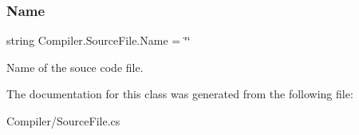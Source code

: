 \subsubsection{\texorpdfstring{Name}{Name}}
{\footnotesize\ttfamily string Compiler.\+Source\+File.\+Name = \char`\"{}\char`\"{}\hspace{0.3cm}{\ttfamily [get]}}

Name of the souce code file. 

The documentation for this class was generated from the following file\+:\begin{DoxyCompactItemize}
\item 
Compiler/Source\+File.\+cs\end{DoxyCompactItemize}

